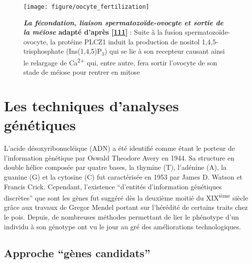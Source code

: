 \documentclass[12pt,a4paper,twoside]{ugathesis}
\theoremstyle{definition}
\theoremstyle{definition}
\theoremstyle{definition}
\theoremstyle{remark}
\begin{document}
\newpage

\begin{figure}

{\centering \texttt{[image: figure/oocyte\_fertilization]} 

}

\caption[La fécondation, liaison spermatozoïde-ovocyte et sortie de la méiose]{\textbf{\emph{La fécondation, liaison
spermatozoïde-ovocyte et sortie de la méiose} adapté d'après
{[}\protect\hyperlink{ref-Clift2013}{111}{]}} : Suite à la fusion
spermatozoïde-ovocyte, la protéine PLCZ1 induit la production de nositol
1,4,5-trisphosphate (Ins(1,4,5)P\(_3\)) qui se lie à son recepteur
causant ainsi le relargage de Ca\textsuperscript{2+} qui, entre autre,
fera sortir l'ovocyte de son stade de méiose pour rentrer en mitose}\label{fig:oocytefertilisation}
\end{figure}









\newpage

\section{Les techniques d'analyses
génétiques}\label{les-techniques-danalyses-genetiques}

L'acide désoxyribonucléique (ADN) a été identifié comme étant le porteur
de l'information génétique par Oswald Theodore Avery en 1944. Sa
structure en double hélice composée par quatre bases, la thymine (T),
l'adénine (A), la guanine (G) et la cytosine (C) fut caractérisée en
1953 par James D. Watson et Francis Crick. Cependant, l'existence
``d'entités d'information génétiques discrètes'' que sont les gènes fut
suggéré dès la deuxième moitié du XIX\textsuperscript{ième} siècle grâce
aux travaux de Gregor Mendel portant sur l'hérédité de certains traits
chez le pois. Depuis, de nombreuses méthodes permettant de lier le
phénotype d'un individu à son génotype ont vu le jour au gré des
améliorations technologiques.

\subsection{\texorpdfstring{Approche ``gènes
candidats''}{Approche gènes candidats}}\label{approche-genes-candidats}
\end{document}
